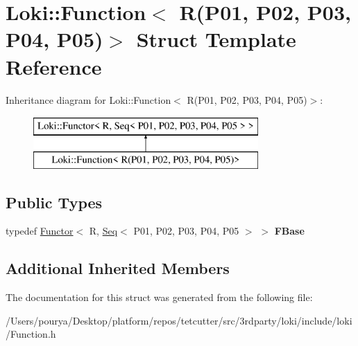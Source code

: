 \hypertarget{structLoki_1_1Function_3_01R_07P01_00_01P02_00_01P03_00_01P04_00_01P05_08_4}{}\section{Loki\+:\+:Function$<$ R(P01, P02, P03, P04, P05)$>$ Struct Template Reference}
\label{structLoki_1_1Function_3_01R_07P01_00_01P02_00_01P03_00_01P04_00_01P05_08_4}
Inheritance diagram for Loki\+:\+:Function$<$ R(P01, P02, P03, P04, P05)$>$\+:\begin{figure}[H]
\begin{center}
\leavevmode
\includegraphics[height=2.000000cm]{structLoki_1_1Function_3_01R_07P01_00_01P02_00_01P03_00_01P04_00_01P05_08_4}
\end{center}
\end{figure}
\subsection*{Public Types}
\begin{DoxyCompactItemize}
\item 
\hypertarget{structLoki_1_1Function_3_01R_07P01_00_01P02_00_01P03_00_01P04_00_01P05_08_4_a043c6f084e3c7fb943cbdbc61729d0fb}{}typedef \hyperlink{classLoki_1_1Functor}{Functor}$<$ R, \hyperlink{structLoki_1_1Seq}{Seq}$<$ P01, P02, P03, P04, P05 $>$ $>$ {\bfseries F\+Base}\label{structLoki_1_1Function_3_01R_07P01_00_01P02_00_01P03_00_01P04_00_01P05_08_4_a043c6f084e3c7fb943cbdbc61729d0fb}

\end{DoxyCompactItemize}
\subsection*{Additional Inherited Members}


The documentation for this struct was generated from the following file\+:\begin{DoxyCompactItemize}
\item 
/\+Users/pourya/\+Desktop/platform/repos/tetcutter/src/3rdparty/loki/include/loki/Function.\+h\end{DoxyCompactItemize}
